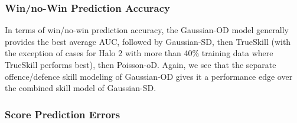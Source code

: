 
\subsubsection{Win/no-Win Prediction Accuracy }

In terms of win/no-win prediction accuracy,
the Gaussian-OD model generally
provides the best average AUC, followed by Gaussian-SD, then
TrueSkill (with the exception of cases for Halo 2 with more than 40\%
training data where TrueSkill performs best), then Poisson-oD.
Again, we see that
the separate offence/defence skill modeling of Gaussian-OD gives
it a performance edge over the combined skill model of Gaussian-SD.



\subsubsection{Score Prediction Errors}

